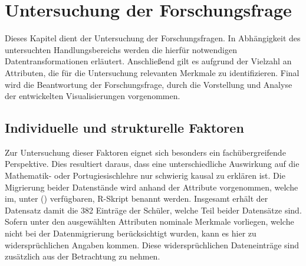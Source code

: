 \chapter[Untersuchung der Forschungsfrage]{Untersuchung der Forschungsfrage}

Dieses Kapitel dient der Untersuchung der Forschungsfragen. 
In Abhängigkeit des untersuchten Handlungsbereichs werden die hierfür notwendigen Datentransformationen erläutert. 
Anschließend gilt es aufgrund der Vielzahl an Attributen, die für die Untersuchung relevanten Merkmale zu identifizieren. 
Final wird die Beantwortung der Forschungsfrage, durch die Vorstellung und Analyse der entwickelten Visualisierungen vorgenommen.

\section{Individuelle und strukturelle Faktoren}

Zur Untersuchung dieser Faktoren eignet sich besonders ein fachübergreifende Perspektive. 
Dies resultiert daraus, dass eine unterschiedliche Auswirkung auf die Mathematik- oder Portugiesischlehre nur schwierig kausal zu erklären ist.
Die Migrierung beider Datenstände wird anhand der Attribute vorgenommen, welche im, unter (\cite[]{student_performance}) verfügbaren, R-Skript benannt werden.
Insgesamt erhält der Datensatz damit die 382 Einträge der Schüler, welche Teil beider Datensätze sind. 
Sofern unter den ausgewählten Attributen nominale Merkmale vorliegen, welche nicht bei der Datenmigrierung berücksichtigt wurden, kann es hier zu widersprüchlichen Angaben kommen.
Diese widersprüchlichen Dateneinträge sind zusätzlich aus der Betrachtung zu nehmen.

